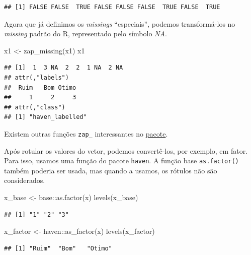 \documentclass[
]{book}
\newenvironment{Shaded}{\begin{snugshade}}{\end{snugshade}}
\newcommand{\FunctionTok}[1]{\textcolor[rgb]{0.00,0.00,0.00}{#1}}
\newcommand{\NormalTok}[1]{#1}
\newcommand{\OtherTok}[1]{\textcolor[rgb]{0.56,0.35,0.01}{#1}}
\newcommand{\SpecialCharTok}[1]{\textcolor[rgb]{0.00,0.00,0.00}{#1}}
\begin{document}
\begin{verbatim}
## [1] FALSE FALSE  TRUE FALSE FALSE FALSE  TRUE FALSE  TRUE
\end{verbatim}

Agora que já definimos os \emph{missings} ``especiais'', podemos transformá-los no \emph{missing} padrão do R, representado pelo símbolo \emph{NA}.

\begin{Shaded}
\begin{Highlighting}[]
\NormalTok{x1 }\OtherTok{\textless{}{-}} \FunctionTok{zap\_missing}\NormalTok{(x1)}
\NormalTok{x1}
\end{Highlighting}
\end{Shaded}

\begin{verbatim}
## [1]  1  3 NA  2  2  1 NA  2 NA
## attr(,"labels")
##  Ruim   Bom Otimo 
##     1     2     3 
## attr(,"class")
## [1] "haven_labelled"
\end{verbatim}

Existem outras funções \texttt{zap\_} interessantes no \href{https://cran.r-project.org/web/packages/haven/haven.pdf}{pacote}.

Após rotular os valores do vetor, podemos convertê-los, por exemplo, em fator. Para isso, usamos uma função do pacote \texttt{haven}.
A função base \texttt{as.factor()} também poderia ser usada, mas quando a usamos, os rótulos não são considerados.

\begin{Shaded}
\begin{Highlighting}[]
\NormalTok{x\_base }\OtherTok{\textless{}{-}}\NormalTok{ base}\SpecialCharTok{::}\FunctionTok{as.factor}\NormalTok{(x)}
\FunctionTok{levels}\NormalTok{(x\_base)}
\end{Highlighting}
\end{Shaded}

\begin{verbatim}
## [1] "1" "2" "3"
\end{verbatim}

\begin{Shaded}
\begin{Highlighting}[]
\NormalTok{x\_factor }\OtherTok{\textless{}{-}}\NormalTok{ haven}\SpecialCharTok{::}\FunctionTok{as\_factor}\NormalTok{(x)}
\FunctionTok{levels}\NormalTok{(x\_factor)}
\end{Highlighting}
\end{Shaded}

\begin{verbatim}
## [1] "Ruim"  "Bom"   "Otimo"
\end{verbatim}
\end{document}
